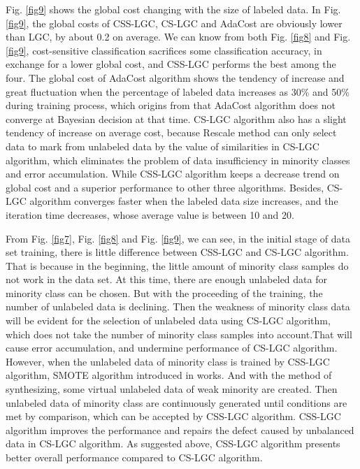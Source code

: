 \documentclass{svjour3}                     %
\begin{document}
Fig. \ref{fig9} shows the global cost changing with the size of labeled data. In Fig. \ref{fig9}, the global costs of CSS-LGC, CS-LGC and AdaCost are obviously lower than LGC, by about 0.2 on average. We can know from both Fig. \ref{fig8} and Fig. \ref{fig9}, cost-sensitive classification sacrifices some classification accuracy, in exchange for a lower global cost, and CSS-LGC performs the best among the four.
The global cost of AdaCost algorithm shows the tendency of increase and great fluctuation when the percentage of labeled data increases as 30\% and 50\% during training process, which origins from that AdaCost algorithm does not converge at Bayesian decision at that time. CS-LGC algorithm also has a slight tendency of increase on average cost, because Rescale method can only select data to mark from unlabeled data by the value of similarities in CS-LGC algorithm, which eliminates the problem of data insufficiency in minority classes and error accumulation. While CSS-LGC algorithm keeps a decrease trend on global cost and a superior performance to other three algorithms. Besides, CS-LGC algorithm converges faster when the labeled data size increases, and the iteration time decreases, whose average value is between 10 and 20. 

 From Fig. \ref{fig7}, Fig. \ref{fig8} and Fig. \ref{fig9}, we can see, in the initial stage of data set training, there is little difference between CSS-LGC and CS-LGC algorithm. That is because in the beginning, the little amount of minority class samples do not work in the data set. At this time, there are enough unlabeled data for minority class can be chosen. But with the proceeding of the training, the number of unlabeled data is declining. Then the weakness of minority class data will be evident for the selection of unlabeled data using CS-LGC algorithm, which does not take the number of minority class samples into account.That will cause error accumulation, and undermine performance of CS-LGC algorithm. However, when the unlabeled data of minority class is trained by CSS-LGC algorithm, SMOTE algorithm introduced in works. And with the method of synthesizing, some virtual unlabeled data of weak minority are created. Then unlabeled data of minority class are continuously generated until conditions are met by comparison, which can be accepted by CSS-LGC algorithm. CSS-LGC algorithm improves the performance and repairs the defect caused by unbalanced data in CS-LGC algorithm. As suggested above, CSS-LGC algorithm presents better overall performance compared to CS-LGC algorithm.
\end{document}
